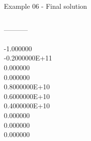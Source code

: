 \begin{frame}{Example 06 - Final solution}
\begin{columns}[t]
\begin{column}{0.3\textwidth}
-----------\\
\\
-1.000000\\
-0.2000000E+11\\
0.000000\\
0.000000\\
0.8000000E+10\\
0.6000000E+10\\
0.4000000E+10\\
0.000000\\
0.000000\\
0.000000\\
\end{column}
\end{columns}


\end{frame}
